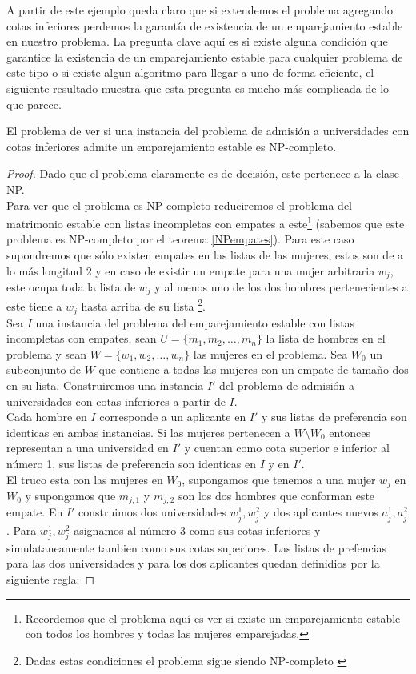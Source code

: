 A partir de este ejemplo queda claro que si extendemos el problema agregando cotas inferiores perdemos la garantía de existencia de un emparejamiento estable en nuestro problema. La pregunta clave aquí es si existe alguna condición que garantice la existencia de un emparejamiento estable para cualquier problema de este tipo o si existe algun algoritmo para llegar a uno de forma eficiente, el siguiente resultado muestra que esta pregunta es mucho más complicada de lo que parece. 

\begin{teo}  \cite{Todo}
\label{np1}
El problema de ver si una instancia del problema de admisión a universidades con cotas inferiores admite un emparejamiento estable es NP-completo. 
\end{teo}

\begin{proof}
Dado que el problema claramente es de decisión, este pertenece a la clase NP. \\ Para ver que el problema es NP-completo reduciremos el problema del matrimonio estable con listas incompletas con empates a este\footnote{Recordemos que el problema aquí es ver si existe un emparejamiento estable con todos los hombres y todas las mujeres emparejadas.} (sabemos que este problema es NP-completo por el teorema \ref{NPempates}). Para este caso supondremos que sólo existen empates en las listas de las mujeres, estos son de a lo más longitud 2 y en caso de existir un empate para una mujer arbitraria $w_j$, este ocupa toda la lista de $w_j$ y al menos uno de los dos hombres pertenecientes a este tiene a $w_j$ hasta arriba de su lista \footnote{Dadas estas condiciones el problema sigue siendo NP-completo \cite{empates}}. \\
Sea $I$ una instancia del problema del emparejamiento estable con listas incompletas con empates, sean $U=\{m_1,m_2,\dots,m_n\}$ la lista de hombres en el problema y sean $W=\{w_1,w_2,\dots,w_n\}$ las mujeres en el problema.  Sea $W_0$ un subconjunto de $W$ que contiene a todas las mujeres con un empate de tamaño dos en su lista.  Construiremos una instancia $I'$ del problema de admisión a universidades con cotas inferiores a partir de $I$.  \\
Cada hombre en $I$ corresponde a un aplicante en $I'$ y sus listas de preferencia son identicas en ambas instancias. Si las mujeres pertenecen a $W \setminus W_0$ entonces representan a una universidad en $I'$ y cuentan como cota superior e inferior al número 1, sus listas de preferencia son identicas en $I$ y en $I'$.\\ El truco esta  con las mujeres en $W_0$, supongamos que tenemos a una mujer $w_j$ en $W_0$ y supongamos que $m_{j,1} $ y $m_{j,2}$ son los dos hombres que conforman este empate. En $I'$ construimos dos universidades $w_j^{1}, w_{j}^2$ y dos aplicantes nuevos $a_j^1, a_j^2$. Para $w_j^{1}, w_{j}^2$ asignamos al número 3 como sus cotas inferiores y simulataneamente tambien como sus cotas superiores. Las listas de prefencias para las dos universidades y para los dos aplicantes quedan definidios por la siguiente regla:

\end{proof}
